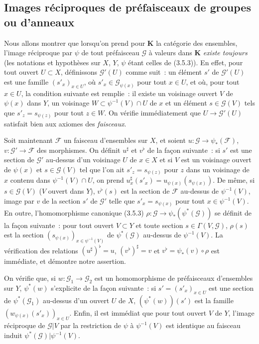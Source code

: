 
\subsection{Images réciproques de préfaisceaux de groupes ou d'anneaux}

\begin{env}[3.7.1]
\label{0.3.7.1-fr}
Nous allons montrer que lorsqu'on prend pour $\boldsymbol{K}$ la catégorie des
ensembles, l'image réciproque par $\psi$ de tout préfaisceau $\mathcal{G}$ à
valeurs dans $\boldsymbol{K}$ \emph{existe toujours} (les notations et hypothèses
sur $X$, $Y$, $\psi$ étant celles de (3.5.3)). En effet, pour tout ouvert
$U\subset X$, définissons $\mathcal{G}'(U)$ comme suit~: un élément $s'$ de
$\mathcal{G}'(U)$ est une famille $(s'_x)_{x\in U}$, où
$s'_x\in\mathcal{G}_{\psi(x)}$ pour tout $x\in U$, et où, pour tout $x\in U$,
la condition suivante est remplie~: il existe un voisinage ouvert $V$ de
$\psi(x)$ dans $Y$, un voisinage $W\subset\psi^{-1}(V)\cap U$ de $x$ et un
élément $s\in\mathcal{G}(V)$ tels que $s'_z=s_{\psi(z)}$ pour tout $z\in W$.
On vérifie immédiatement que $U\to\mathcal{G}'(U)$ satisfait bien aux axiomes
des \emph{faisceaux}.

Soit maintenant $\mathcal{F}$ un faisceau d'ensembles sur $X$, et soient
$u:\mathcal{G}\to\psi_*(\mathcal{F})$,
$v:\mathcal{G}'\to\mathcal{F}$ des morphismes. On définit $u^\sharp$ et $v^\flat$
de la façon suivante~: si $s'$ est une section de $\mathcal{G}'$ au-dessus
d'un voisinage $U$ de $x\in X$ et si $V$ est un voisinage ouvert de $\psi(x)$
et $s\in\mathcal{G}(V)$ tel que l'on ait $s'_z=s_{\psi(z)}$ pour $z$ dans un
voisinage de $x$ contenu dans $\psi^{-1}(V)\cap U$, on prend
$u_x^\sharp(s'_x)=u_{\psi(x)}(s_{\psi(x)})$. De même, si
$s\in\mathcal{G}(V)$ ($V$ ouvert dans $Y$), $v^\flat(s)$ est la section de
$\mathcal{F}$ au-dessus de $\psi^{-1}(V)$, image par $v$ de la section $s'$ de
$\mathcal{G}'$ telle que $s'_x=s_{\psi(x)}$ pour tout
$x\in\psi^{-1}(V)$. En outre, l'homomorphisme canonique (3.5.3)
$\rho:\mathcal{G}\to\psi_*(\psi^*(\mathcal{G}))$ se définit de la façon
suivante~: pour tout ouvert $V\subset Y$ et toute section
$s\in\Gamma(V,\mathcal{G})$, $\rho(s)$ est la section
$(s_{\psi(x)})_{x\in\psi^{-1}(V)}$ de $\psi^*(\mathcal{G})$ au-dessus de
$\psi^{-1}(V)$. La vérification des relations
$(u^\sharp)^\flat=u$, $(v^\flat)^\sharp=v$ et
$v^\flat=\psi_*(v)\circ\rho$ est immédiate, et démontre notre assertion.

On vérifie que, si $w:\mathcal{G}_1\to\mathcal{G}_2$ est un homomorphisme de
préfaisceaux d'ensembles sur $Y$, $\psi^*(w)$ s'explicite de la façon
suivante~: si $s'=(s'_x)_{x\in U}$ est une section de
$\psi^*(\mathcal{G}_1)$ au-dessus d'un ouvert $U$ de $X$,
$(\psi^*(w))(s')$ est la famille
$(w_{\psi(x)}(s'_x))_{x\in U}$. Enfin, il est immédiat que pour tout ouvert
$V$ de $Y$, l'image réciproque de $\mathcal{G}|V$ par la restriction de
$\psi$ à $\psi^{-1}(V)$ est identique au faisceau induit
$\psi^*(\mathcal{G})|\psi^{-1}(V)$.


\end{env}
